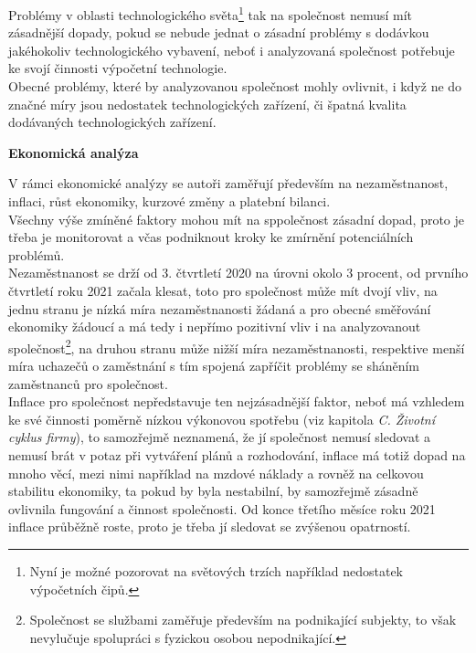 Problémy v oblasti technologického světa\footnote{Nyní je možné pozorovat na světových trzích například nedostatek výpočetních čipů.} tak na společnost nemusí mít zásadnější dopady, pokud se nebude jednat o zásadní problémy s dodávkou jakéhokoliv technologického vybavení, neboť i analyzovaná společnost potřebuje ke svojí činnosti výpočetní technologie.\\

Obecné problémy, které by analyzovanou společnost mohly ovlivnit, i když ne do značné míry jsou nedostatek technologických zařízení, či špatná kvalita dodávaných technologických zařízení.\\

\newpage

\noindent\textbf{Ekonomická analýza}\\

\vspace*{-2mm}

V rámci ekonomické analýzy se autoři zaměřují především na nezaměstnanost, inflaci, růst ekonomiky, kurzové změny a platební bilanci.\\

Všechny výše zmíněné faktory mohou mít na sppolečnost zásadní dopad, proto je třeba je mo\-nitorovat a včas podniknout kroky ke zmírnění potenciálních problémů.\\

Nezaměstnanost se drží od 3. čtvrtletí 2020 na úrovni okolo 3 procent, od prvního čtvrtletí roku 2021 začala klesat, toto pro společnost může mít dvojí vliv, na jednu stranu je nízká míra nezaměstnanosti žádaná a pro obecné směřování ekonomiky žádoucí a má tedy i nepřímo pozitivní vliv i na analyzovanout společnost\footnote{Společnost se službami zaměřuje především na podnikající subjekty, to však nevylučuje spolupráci s fyzickou osobou nepodnikající.}, na druhou stranu může nižší míra nezaměstnanosti, respektive menší míra uchazečů o zaměstnání s tím spojená zapříčit problémy se sháněním zaměstnanců pro společnost.\\

Inflace pro společnost nepředstavuje ten nejzásadnější faktor, neboť má vzhledem ke své činnosti poměrně nízkou výkonovou spotřebu (viz kapitola \textit{C. Životní cyklus firmy}), to samozřejmě neznamená, že jí společnost nemusí sledovat a nemusí brát v potaz při vytváření plánů a rozhodování, inflace má totiž dopad na mnoho věcí, mezi nimi například na mzdové náklady a rovněž na celkovou stabilitu ekonomiky, ta pokud by byla nestabilní, by samozřejmě zásadně ovlivnila fungování a činnost společnosti. Od konce třetího měsíce roku 2021 inflace průběžně roste, proto je třeba jí sledovat se zvýšenou opatrností.\\

